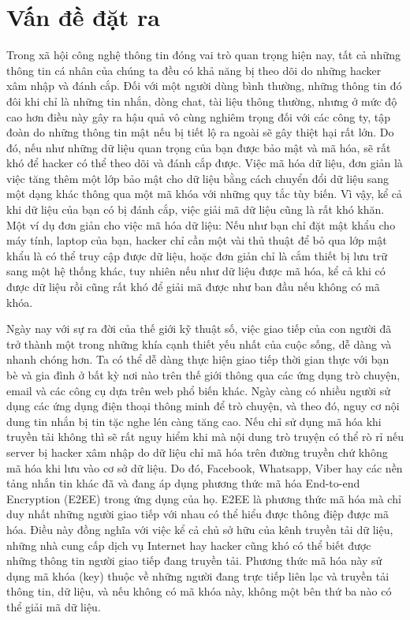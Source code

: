 \documentclass[../main-report.tex]{subfiles}
\begin{document}
\section{Vấn đề đặt ra}
\label{sec:problem}
Trong xã hội công nghệ thông tin đóng vai trò quan trọng hiện nay, tất cả những thông tin cá nhân của chúng ta đều có khả năng bị theo dõi do những hacker xâm nhập và đánh cắp. Đối với một người dùng bình thường, những thông tin đó đôi khi chỉ là những tin nhắn, dòng chat, tài liệu thông thường, nhưng ở mức độ cao hơn điều này gây ra hậu quả vô cùng nghiêm trọng đối với các công ty, tập đoàn do những thông tin mật nếu bị tiết lộ ra ngoài sẽ gây thiệt hại rất lớn. Do đó, nếu như những dữ liệu quan trọng của bạn được bảo mật và mã hóa, sẽ rất khó để hacker có thể theo dõi và đánh cắp được. Việc mã hóa dữ liệu, đơn giản là việc tăng thêm một lớp bảo mật cho dữ liệu bằng cách chuyển đổi dữ liệu sang một dạng khác thông qua một mã khóa với những quy tắc tùy biến. Vì vậy, kể cả khi dữ liệu của bạn có bị đánh cắp, việc giải mã dữ liệu cũng là rất khó khăn. Một ví dụ đơn giản cho việc mã hóa dữ liệu: Nếu như bạn chỉ đặt mật khẩu cho máy tính, laptop của bạn, hacker chỉ cần một vài thủ thuật để bỏ qua lớp mật khẩu là có thể truy cập được dữ liệu, hoặc đơn giản chỉ là cắm thiết bị lưu trữ sang một hệ thống khác, tuy nhiên nếu như dữ liệu được mã hóa, kể cả khi có được dữ liệu rồi cũng rất khó để giải mã được như ban đầu nếu không có mã khóa.

Ngày nay với sự ra đời của thế giới kỹ thuật số, việc giao tiếp của con người đã trở thành một trong những khía cạnh thiết yếu nhất của cuộc sống, dễ dàng và nhanh chóng hơn. Ta có thể dễ dàng thực hiện giao tiếp thời gian thực với bạn bè và gia đình ở bất kỳ nơi nào trên thế giới thông qua các ứng dụng trò chuyện, email và các công cụ dựa trên web phổ biến khác. Ngày càng có nhiều người sử dụng các ứng dụng điện thoại thông minh để trò chuyện, và theo đó, nguy cơ nội dung tin nhắn bị tin tặc nghe lén càng tăng cao. Nếu chỉ sử dụng mã hóa khi truyền tải không thì sẽ rất nguy hiểm khi mà nội dung trò truyện có thể rò rỉ nếu server bị hacker xâm nhập do dữ liệu chỉ mã hóa trên đường truyền chứ không mã hóa khi lưu vào cơ sở dữ liệu. Do đó, Facebook, Whatsapp, Viber hay các nền tảng nhắn tin khác đã và đang áp dụng phương thức mã hóa End-to-end Encryption (E2EE) trong ứng dụng của họ. E2EE là phương thức mã hóa mà chỉ duy nhất những người giao tiếp với nhau có thể hiểu được thông điệp được mã hóa. Điều này đồng nghĩa với việc kể cả chủ sở hữu của kênh truyền tải dữ liệu, những nhà cung cấp dịch vụ Internet hay hacker cũng khó có thể biết được những thông tin người giao tiếp đang truyền tải. Phương thức mã hóa này sử dụng mã khóa (key) thuộc về những người đang trực tiếp liên lạc và truyền tải thông tin, dữ liệu, và nếu không có mã khóa này, không một bên thứ ba nào có thể giải mã dữ liệu.
\end{document}
